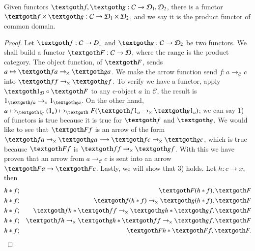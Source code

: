 \documentclass [12pt]{book}
\begin{document}
\begin{proposition}Given functors $\textgoth f,\textgoth g:\mathcal C\rightarrow\mathcal D_1,\mathcal D_2$, there is a functor $\textgoth f\times\textgoth g:\mathcal C\rightarrow\mathcal D_1\times\mathcal D_2$, and we say it is the product functor of common domain.\label{common domain 1}\end{proposition}

\begin{proof}Let $\textgoth f:\mathcal C\rightarrow D_1$ and $\textgoth g:\mathcal C\rightarrow\mathcal D_2$ be two functors. We shall build a functor $\textgoth F:\mathcal C\rightarrow\mathcal D$, where the range is the product category. The object function, of $\textgoth F$, sends $a\mapsto\textgoth fa\rightarrow_\times\textgoth ga$. We make the arrow function send $f:a\rightarrow_{\mathcal C}c$ into $\textgoth ff\rightarrow_\times\textgoth gf$. To verify we have a functor, apply $\textgoth1_\mathcal D\circ\textgoth F$ to any c-object $a$ in $\mathcal C$, the result is $1_{\textgoth fa}\rightarrow_\times1_{\textgoth ga}$. On the other hand, $a\mapsto_{\textgoth1_\mathcal C}(1_a)\mapsto_\textgoth F(\textgoth f1_a\rightarrow_\times\textgoth g1_a)$; we can say 1) of functors is true because it is true for $\textgoth f$ and $\textgoth g$. We would like to see that $\textgoth Ff$ is an arrow of the form $\textgoth fa\rightarrow_\times\textgoth ga\longrightarrow\textgoth fc\rightarrow_\times\textgoth gc$, which is true because $\textgoth Ff$ is $\textgoth ff\rightarrow_\times\textgoth gf$. With this we have proven that an arrow from $a\rightarrow_\mathcal Cc$ is sent into an arrow $\textgoth Fa\rightarrow\textgoth Fc$. Lastly, we will show that 3) holds. Let $h:c\rightarrow x$, then\begin{eqnarray}\nonumber h*f&;&\textgoth F(h*f),\textgoth F\\\nonumber h*f&;&\textgoth f(h*f)\rightarrow_\times\textgoth g(h*f),\textgoth F\\\nonumber h*f&;&\textgoth fh*\textgoth ff\rightarrow_\times\textgoth gh*\textgoth gf,\textgoth F\\\nonumber h*f&;&\textgoth fh\rightarrow_\times\textgoth gh*\textgoth ff\rightarrow_\times\textgoth gf,\textgoth F\\\nonumber h*f&;&\textgoth Fh*\textgoth Ff,\textgoth F.\end{eqnarray}\end{proof}
\end{document}

